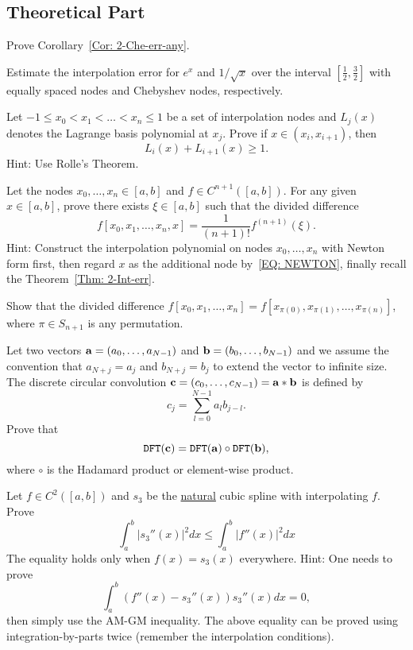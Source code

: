 \subsection{Theoretical Part}
\begin{problem}
    Prove Corollary~\ref{Cor: 2-Che-err-any}.
\end{problem}
\begin{problem}
\label{Prb: 2-Theo-2}
    Estimate the interpolation error for $e^x$ and $1/\sqrt{x}$ over the interval $[\frac{1}{2}, \frac{3}{2}]$ with equally spaced nodes and Chebyshev nodes, respectively.
\end{problem}
\begin{problem}
    Let $-1\le x_0 < x_1 <\dots < x_n \le 1$ be a set of interpolation nodes and $L_j(x)$ denotes the Lagrange basis polynomial at $x_j$. Prove if $x\in (x_i, x_{i+1})$, then 
    $$L_{i}(x) + L_{i+1}(x) \ge 1.$$
    Hint: Use Rolle's Theorem.
\end{problem}
\begin{problem}
\label{Prb: 2-Theo-4}
    Let the nodes $x_0, \dots, x_n\in[a,b]$ and $f\in C^{n+1}([a, b])$. For any given $x\in[a, b]$, prove there exists $\xi\in [a, b]$ such that the divided difference $$f[x_0, x_1, \dots, x_n, x] = \frac{1}{(n+1)!}f^{(n+1)}(\xi).$$
    Hint: {Construct the interpolation polynomial on nodes $x_0, \dots, x_n$ with Newton form first, then regard $x$ as the additional node by~\eqref{EQ: NEWTON}, finally recall the Theorem~\ref{Thm: 2-Int-err}.}
\end{problem}
\begin{problem}
    Show that the divided difference $f[x_0, x_1,\dots, x_n] = f[x_{\pi(0)}, x_{\pi(1)},\dots, x_{\pi(n)}]$, where $\pi\in S_{n+1}$ is any permutation.
\end{problem}
\begin{problem}
    Let two vectors $\mathbf a = (a_0,\dots, a_{N-1})$ and $\mathbf b = (b_0, \dots, b_{N-1})$ and we assume the convention that $a_{N + j} = a_j$ and $b_{N+j} = b_j$ to extend the vector to infinite size. The discrete circular convolution $\mathbf c = (c_0,\dots, c_{N-1}) = \mathbf a\ast \mathbf b$ is defined by 
$$c_j = \sum_{l = 0}^{N-1} a_l b_{j - l}.$$
Prove that 
$$\textup{\texttt{DFT}}(\mathbf c) = \textup{\texttt{DFT}}(\mathbf a)\circ \textup{\texttt{DFT}}(\mathbf b),$$
where $\circ$ is the Hadamard product or element-wise product.
\end{problem}
\begin{problem} Let $f\in C^2([a, b])$ and $s_3$ be the \underline{natural} cubic spline with interpolating $f$. Prove 
    \begin{equation}
        \int_a^b |s_3''(x)|^2 dx \le \int_{a}^b |f''(x)|^2 dx 
    \end{equation}
    The equality holds only when $f(x) = s_3(x)$ everywhere.
    Hint: One needs to prove 
    \begin{equation}
        \int_a^b (f''(x) - s_3''(x)) s_3''(x) dx = 0,
    \end{equation}
    then simply use the AM-GM inequality. The above equality can be proved using integration-by-parts twice (remember the interpolation conditions).
\end{problem}
